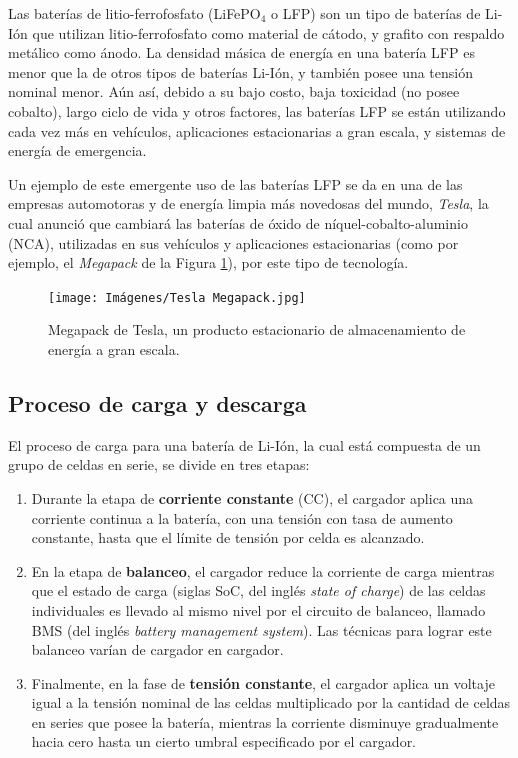 Las baterías de litio-ferrofosfato (LiFePO$_4$ o LFP) son un tipo de baterías de Li-Ión que utilizan litio-ferrofosfato como material de cátodo, y grafito con respaldo metálico como ánodo. La densidad másica de energía en una batería LFP es menor que la de otros tipos de baterías Li-Ión, y también posee una tensión nominal menor. Aún así, debido a su bajo costo, baja toxicidad (no posee cobalto), largo ciclo de vida y otros factores, las baterías LFP se están utilizando cada vez más en vehículos, aplicaciones estacionarias a gran escala, y sistemas de energía de emergencia.

Un ejemplo de este emergente uso de las baterías LFP se da en una de las empresas automotoras y de energía limpia más novedosas del mundo, \emph{Tesla}, la cual anunció que cambiará las baterías de óxido de níquel-cobalto-aluminio (NCA), utilizadas en sus vehículos y aplicaciones estacionarias (como por ejemplo, el \emph{Megapack} de la Figura \ref{megapack}), por este tipo de tecnología.

\begin{figure}[hbt!]
  \centering
  \texttt{[image: Imágenes/Tesla Megapack.jpg]}
  \caption{Megapack de Tesla, un producto estacionario de almacenamiento de energía a gran escala.}
  \label{megapack}
\end{figure} 

\subsection{Proceso de carga y descarga}

El proceso de carga para una batería de Li-Ión, la cual está compuesta de un grupo de celdas en serie, se divide en tres etapas:

\begin{enumerate}
  \item Durante la etapa de \textbf{corriente constante} (CC), el cargador aplica una corriente continua a la batería, con una tensión con tasa de aumento constante, hasta que el límite de tensión por celda es alcanzado.
  \item En la etapa de \textbf{balanceo}, el cargador reduce la corriente de carga mientras que el estado de carga (siglas SoC, del inglés \emph{state of charge}) de las celdas individuales es llevado al mismo nivel por el circuito de balanceo, llamado BMS (del inglés \emph{battery management system}). Las técnicas para lograr este balanceo varían de cargador en cargador.
  \item Finalmente, en la fase de \textbf{tensión constante}, el cargador aplica un voltaje igual a la tensión nominal de las celdas multiplicado por la cantidad de celdas en series que posee la batería, mientras la corriente disminuye gradualmente hacia cero hasta un cierto umbral especificado por el cargador. 
\end{enumerate}

